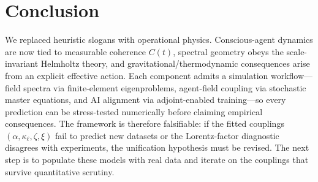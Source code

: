 \documentclass[12pt,a4paper]{article}
\theoremstyle{definition}
\begin{document}
\section{Conclusion}

We replaced heuristic slogans with operational physics. Conscious-agent dynamics are now tied to measurable coherence $C(t)$, spectral geometry obeys the scale-invariant Helmholtz theory, and gravitational/thermodynamic consequences arise from an explicit effective action. Each component admits a simulation workflow---field spectra via finite-element eigenproblems, agent-field coupling via stochastic master equations, and AI alignment via adjoint-enabled training---so every prediction can be stress-tested numerically before claiming empirical consequences. The framework is therefore falsifiable: if the fitted couplings $(\alpha,\kappa_\ell,\zeta,\xi)$ fail to predict new datasets or the Lorentz-factor diagnostic disagrees with experiments, the unification hypothesis must be revised. The next step is to populate these models with real data and iterate on the couplings that survive quantitative scrutiny.
\end{document}
